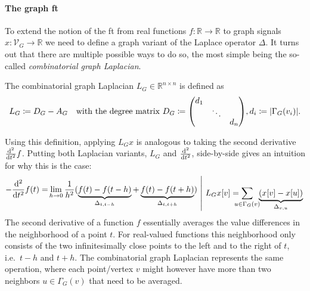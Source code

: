 \paragraph{The graph \acl{ft}}
To extend the notion of the \ac{ft} from real functions $f: \mathbb{R} \to \mathbb{R}$ to graph signals $x: \mathcal{V}_G \to \mathbb{R}$ we need to define a graph variant of the Laplace operator $\Delta$.
It turns out that there are multiple possible ways to do so, the most simple being the so-called \textit{combinatorial graph Laplacian}.
\begin{defn}\label{defn:related:laplacian-comb}
	The combinatorial graph Laplacian $L_G \in \mathbb{R}^{n \times n}$ is defined as
	\begin{align*}
		L_G \coloneqq D_G - A_G\quad\text{with the degree matrix } D_G\coloneqq {
			\renewcommand*{\arraystretch}{0.5}
			\begin{pmatrix}
				d_1 & & \\
				& \ddots & \\
				& & d_n
			\end{pmatrix}
		}, d_i \coloneqq |\Gamma_G(v_i)| \text{.}
	\end{align*}
\end{defn}
Using this definition, applying $L_G x$ is analogous to taking the second derivative $\frac{\mathop{}\!\mathrm{d}^2}{\mathop{}\!\mathrm{d} t^2} f$.
Putting both Laplacian variants, $L_G$ and $\frac{\mathop{}\!\mathrm{d}^2}{\mathop{}\!\mathrm{d} t^2}$, side-by-side gives an intuition for why this is the case:
\begin{equation*}
	\begin{split}
		-\frac{\dif^2}{\dif t^2} f(t) = \smashoperator[l]{\lim_{h \to 0}} \frac{1}{h^2} (\underbrace{f(t) - f(t-h)}_{\Delta_{t, t-h}} + \underbrace{f(t) -  f(t+h)}_{\Delta_{t, t+h}})
	\end{split}
	\begin{split}\ \left|\ %
		L_G x[v] = \smashoperator[l]{\sum_{u \in \Gamma_G(v)}}\mkern-6mu \underbrace{(x[v] - x[u])}_{\Delta_{v, u}}
	\right.\end{split}
\end{equation*}
The second derivative of a function $f$ essentially averages the value differences in the neighborhood of a point $t$.
For real-valued functions this neighborhood only consists of the two infinitesimally close points to the left and to the right of $t$, i.e.\ $t - h$ and $t + h$.
The combinatorial graph Laplacian represents the same operation, where each point/vertex $v$ might however have more than two neighbors $u \in \Gamma_G(v)$ that need to be averaged.

